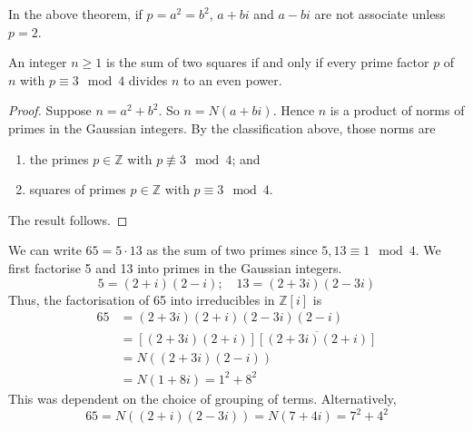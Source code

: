 \begin{remark}
	In the above theorem, if \( p = a^2 = b^2 \), \( a+bi \) and \( a-bi \) are not associate unless \( p = 2 \).
\end{remark}
\begin{corollary}
	An integer \( n \geq 1 \) is the sum of two squares if and only if every prime factor \( p \) of \( n \) with \( p \equiv 3 \mod 4 \) divides \( n \) to an even power.
\end{corollary}
\begin{proof}
	Suppose \( n = a^2 + b^2 \).
	So \( n = N(a+bi) \).
	Hence \( n \) is a product of norms of primes in the Gaussian integers.
	By the classification above, those norms are
	\begin{enumerate}
		\item the primes \( p \in \mathbb Z \) with \( p \not\equiv 3 \mod 4 \); and
		\item squares of primes \( p \in \mathbb Z \) with \( p \equiv 3 \mod 4 \).
	\end{enumerate}
	The result follows.
\end{proof}
\begin{example}
	We can write \( 65 = 5 \cdot 13 \) as the sum of two primes since \( 5, 13 \equiv 1 \mod 4 \).
	We first factorise 5 and 13 into primes in the Gaussian integers.
	\[ 5 = (2+i)(2-i);\quad 13 = (2+3i)(2-3i) \]
	Thus, the factorisation of 65 into irreducibles in \( \mathbb Z[i] \) is
    \begin{align*}
        65 &= (2+3i)(2+i)(2-3i)(2-i) \\
        &= [(2+3i)(2+i)]\overline{[(2+3i)(2+i)]} \\
        &= N((2+3i)(2-i)) \\
        &= N(1+8i) = 1^2 + 8^2
    \end{align*}
	This was dependent on the choice of grouping of terms.
	Alternatively,
	\[ 65 = N((2+i)(2-3i)) = N(7+4i) = 7^2 + 4^2 \]
\end{example}

